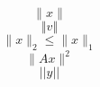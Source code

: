 \documentclass{article}
\begin{document}
\[ \|x\| \]
\[ \Vert v \Vert \]
\[ \|x\|_2 \le \|x\|_1 \]
\[ \|A x\|^2 \]
\[ ||y|| \]
\end{document}
